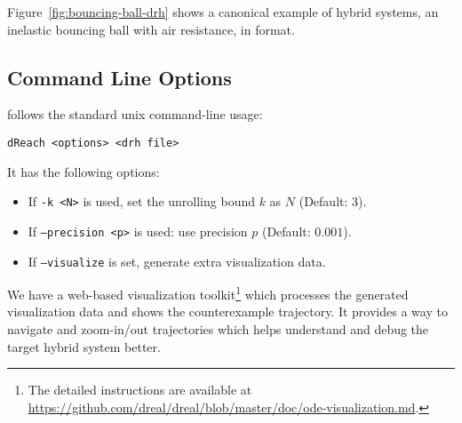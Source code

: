 Figure~\ref{fig:bouncing-ball-drh} shows a canonical example of hybrid
systems, an inelastic bouncing ball with air resistance, in \drh{}
format.

\subsection{Command Line Options}
\dReach{} follows the standard unix command-line usage:
\begin{Verbatim}[fontfamily=courier, framesep=1mm, fontsize=\small]
dReach <options> <drh file>
\end{Verbatim}
It has the following options:
\begin{itemize}
\item If \texttt{-k <N>} is used, set the unrolling bound $k$ as $N$ (Default: 3).
\item If \texttt{--precision <p>} is used: use precision $p$ (Default: $0.001$).
\item If \texttt{--visualize} is set, \dReach{} generate extra visualization data.
\end{itemize}
We have a web-based visualization toolkit\footnote{The detailed
  instructions are available at
  \url{https://github.com/dreal/dreal/blob/master/doc/ode-visualization.md}.}
which processes the generated visualization data and shows the
counterexample trajectory. It provides a way to navigate and
zoom-in/out trajectories which helps understand and debug the target
hybrid system better.

